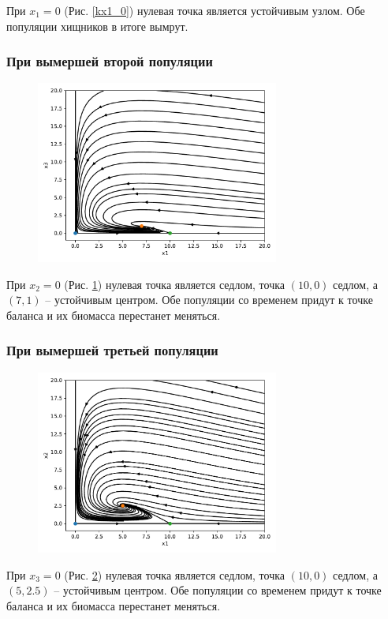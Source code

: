     При \(x_1 = 0\) (Рис. \ref{kx1_0}) нулевая точка является устойчивым узлом. Обе популяции хищников в итоге вымрут.

    \subsubsection{При вымершей второй популяции}

    \begin{figure}[H]
        \centering
        \includegraphics[width=8cm]{pictures/kx2_0vector.pdf}
        \caption{} \label{kx2_0}
    \end{figure}
    При \(x_2 = 0\) (Рис. \ref{kx2_0}) нулевая точка является седлом, точка \((10, 0)\) седлом, а \( \left( 7, 1 \right) \) -- устойчивым центром. Обе популяции со временем придут к точке баланса и их биомасса перестанет меняться.

    \subsubsection{При вымершей третьей популяции}

    \begin{figure}[H]
        \centering
        \includegraphics[width=8cm]{pictures/kx3_0vector.pdf}
        \caption{} \label{kx3_0}
    \end{figure}
    При \(x_3 = 0\) (Рис. \ref{kx3_0}) нулевая точка является седлом, точка \((10, 0)\) седлом, а \( \left( 5, 2.5 \right) \) -- устойчивым центром. Обе популяции со временем придут к точке баланса и их биомасса перестанет меняться.

